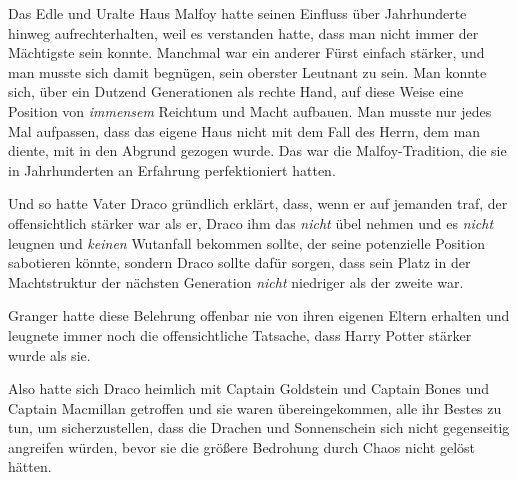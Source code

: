 Das Edle und Uralte Haus Malfoy hatte seinen Einfluss über Jahrhunderte hinweg aufrechterhalten, weil es verstanden hatte, dass man nicht immer der Mächtigste sein konnte. Manchmal war ein anderer Fürst einfach stärker, und man musste sich damit begnügen, sein oberster Leutnant zu sein. Man konnte sich, über ein Dutzend Generationen als rechte Hand, auf diese Weise eine Position von \emph{immensem} Reichtum und Macht aufbauen. Man musste nur jedes Mal aufpassen, dass das eigene Haus nicht mit dem Fall des Herrn, dem man diente, mit in den Abgrund gezogen wurde. Das war die Malfoy-Tradition, die sie in Jahrhunderten an Erfahrung perfektioniert hatten.

Und so hatte Vater Draco gründlich erklärt, dass, wenn er auf jemanden traf, der offensichtlich stärker war als er, Draco ihm das \emph{nicht} übel nehmen und es \emph{nicht} leugnen und \emph{keinen} Wutanfall bekommen sollte, der seine potenzielle Position sabotieren könnte, sondern Draco sollte dafür sorgen, dass sein Platz in der Machtstruktur der nächsten Generation \emph{nicht} niedriger als der zweite war.

Granger hatte diese Belehrung offenbar nie von ihren eigenen Eltern erhalten und leugnete immer noch die offensichtliche Tatsache, dass Harry Potter stärker wurde als sie.

Also hatte sich Draco heimlich mit Captain Goldstein und Captain Bones und Captain Macmillan getroffen und sie waren übereingekommen, alle ihr Bestes zu tun, um sicherzustellen, dass die Drachen und Sonnenschein sich nicht gegenseitig angreifen würden, bevor sie die größere Bedrohung durch Chaos nicht gelöst hätten.

